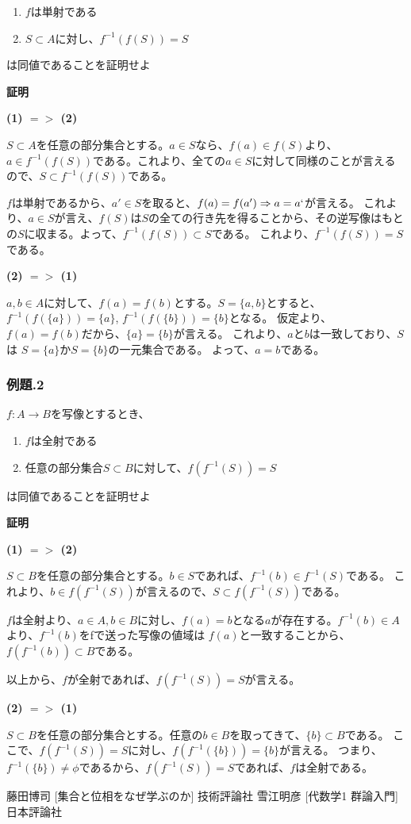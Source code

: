 \documentclass[dvipdfmx,autodetect-engine]{jsarticle}
\begin{document}
\begin{enumerate}
	\item $f$は単射である
	\item $S \subset A$に対し、$f^{-1}(f(S)) = S$
\end{enumerate}

は同値であることを証明せよ

{\bf 証明}

{\bf (1) $ => $ (2)}

$S \subset A$を任意の部分集合とする。$a \in S$なら、$f(a) \in f(S)$より、
$a \in f^{-1}(f(S))$である。これより、全ての$a \in S$に対して同様のことが言えるので、$S \subset f^{-1}(f(S))$である。

$f$は単射であるから、$a' \in S$を取ると、$f(a) = f(a') \Rightarrow a = a`$が言える。
これより、$a \in S$が言え、$f(S)$は$S$の全ての行き先を得ることから、その逆写像はもとの$S$に収まる。よって、$f^{-1}(f(S)) \subset S$である。
これより、$f^{-1}(f(S)) = S$である。

{\bf (2) $ => $ (1)}

$a, b \in A$に対して、$f(a) = f(b)$とする。$S = \{a, b\}$とすると、
$f^{-1}(f(\{a\})) = \{a\}$, $f^{-1}(f(\{b\})) = \{b\}$となる。
仮定より、$f(a) = f(b)$だから、$\{a\} = \{b\}$が言える。
これより、$aとb$は一致しており、$S$は $S = \{a\}$か$S = \{b\}$の一元集合である。
よって、$a = b$である。


\subsubsection { 例題.2 }

$f:A \to B$を写像とするとき、

\begin{enumerate}
	\item $f$は全射である
	\item 任意の部分集合$S \subset B$に対して、$f(f^{-1}(S)) = S$
\end{enumerate}

は同値であることを証明せよ

{\bf 証明}

{\bf (1) $ => $ (2)}

$S \subset B$を任意の部分集合とする。$b \in S$であれば、$f^{-1}(b) \in f^{-1}(S)$である。
これより、$b \in f(f^{-1}(S))$が言えるので、$S \subset f(f^{-1}(S))$である。

$f$は全射より、$a \in A, b \in B$に対し、$f(a) = b$となる$a$が存在する。$f^{-1}(b) \in A$より、$f^{-1}(b)$をfで送った写像の値域は $f(a)$と一致することから、$f(f^{-1}(b)) \subset B$である。

以上から、$f$が全射であれば、$f(f^{-1}(S)) = S$が言える。

{\bf (2) $ => $ (1)}

$S \subset B$を任意の部分集合とする。任意の$b \in B$を取ってきて、$\{b\} \subset B$である。
ここで、$f(f^{-1}(S)) = S$に対し、$f(f^{-1}(\{b\})) = \{b\}$が言える。
つまり、$f^{-1}(\{b\}) \neq \phi$であるから、$f(f^{-1}(S)) = S$であれば、$f$は全射である。


\begin{thebibliography}{n}
 藤田博司 [集合と位相をなぜ学ぶのか] 技術評論社
 雪江明彦 [代数学1 群論入門] 日本評論社
\end{thebibliography}
\end{document}
